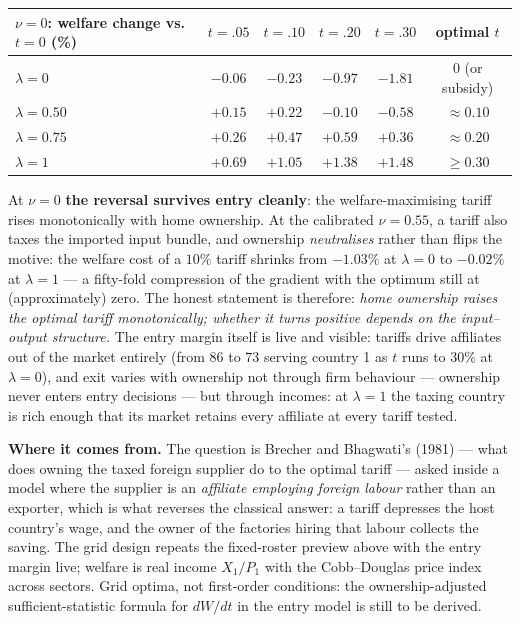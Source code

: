 \documentclass[11pt]{article}
\newcommand{\from}[1]{\smallskip\noindent\textbf{Where it comes from.} #1\smallskip}
\theoremstyle{plain}
\theoremstyle{remark}
\theoremstyle{definition}
\begin{document}
\begin{center}
\small
\begin{tabular}{lccccc}
\toprule
$\nu=0$: welfare change vs.\ $t=0$ (\%) & $t=.05$ & $t=.10$ & $t=.20$ & $t=.30$ & optimal $t$\\
\midrule
$\lambda=0$    & $-0.06$ & $-0.23$ & $-0.97$ & $-1.81$ & $0$ (or subsidy)\\
$\lambda=0.50$ & $+0.15$ & $+0.22$ & $-0.10$ & $-0.58$ & $\approx0.10$\\
$\lambda=0.75$ & $+0.26$ & $+0.47$ & $+0.59$ & $+0.36$ & $\approx0.20$\\
$\lambda=1$    & $+0.69$ & $+1.05$ & $+1.38$ & $+1.48$ & $\ge0.30$\\
\bottomrule
\end{tabular}
\end{center}

\noindent At $\nu=0$ \textbf{the reversal survives entry cleanly}: the
welfare-maximising tariff rises monotonically with home ownership. At the calibrated
$\nu=0.55$, a tariff also taxes the imported input bundle, and ownership
\emph{neutralises} rather than flips the motive: the welfare cost of a $10\%$ tariff
shrinks from $-1.03\%$ at $\lambda=0$ to $-0.02\%$ at $\lambda=1$ --- a fifty-fold
compression of the gradient with the optimum still at (approximately) zero. The honest
statement is therefore: \emph{home ownership raises the optimal tariff monotonically;
whether it turns positive depends on the input--output structure.} The entry margin
itself is live and visible: tariffs drive affiliates out of the market entirely (from
$86$ to $73$ serving country 1 as $t$ runs to $30\%$ at $\lambda=0$), and exit varies
with ownership not through firm behaviour --- ownership never enters entry decisions
--- but through incomes: at $\lambda=1$ the taxing country is rich enough that its
market retains every affiliate at every tariff tested.

\from{The question is Brecher and Bhagwati's (1981) --- what does owning the taxed
foreign supplier do to the optimal tariff --- asked inside a model where the supplier
is an \emph{affiliate employing foreign labour} rather than an exporter, which is what
reverses the classical answer: a tariff depresses the host country's wage, and the
owner of the factories hiring that labour collects the saving. The grid design repeats
the fixed-roster preview above with the entry margin live; welfare is real income
$X_1/P_1$ with the Cobb--Douglas price index across sectors. Grid optima, not
first-order conditions: the ownership-adjusted sufficient-statistic formula for
$dW/dt$ in the entry model is still to be derived.}
\end{document}
